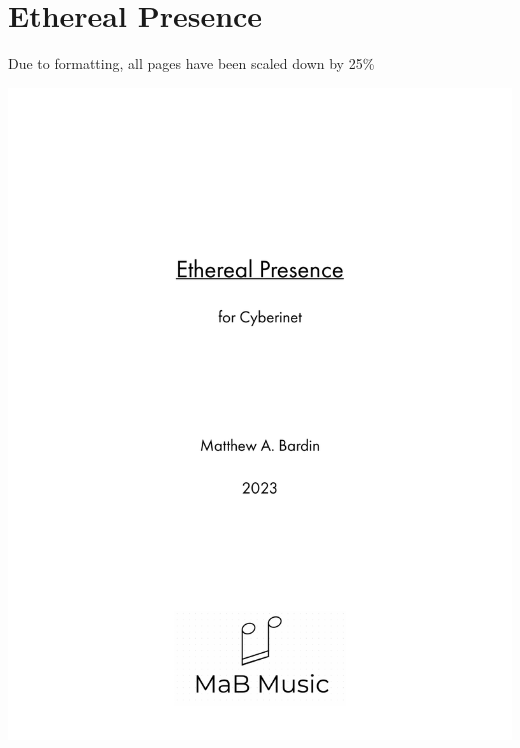 \section{Ethereal Presence}
Due to formatting, all pages have been scaled down by 25\%
\begin{center}
     \includegraphics[scale=0.7]{Scores/EPPart1.pdf}
\end{center}
\newpage
